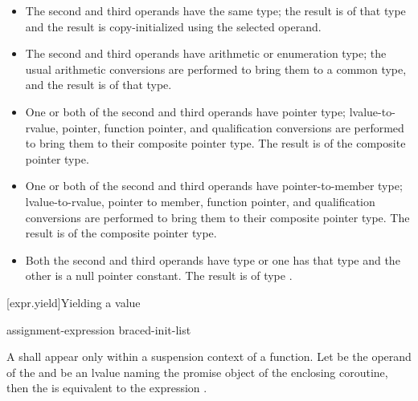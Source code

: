 \begin{itemize}
\item The second and third operands have the same type; the result is of
that type and the result is copy-initialized using the selected operand.

\item The second and third operands have arithmetic or enumeration type;
the usual arithmetic conversions are performed to bring them to a common
type, and the result is of that type.

\item One or both of the second and third operands have pointer type;
lvalue-to-rvalue,
pointer,
function pointer, and
qualification conversions
are performed to bring them to their
composite pointer type. The result is of the composite
pointer type.

\item One or both of the second and third operands have pointer-to-member type;
lvalue-to-rvalue,
pointer to member,
function pointer, and
qualification conversions
are performed to bring them to their composite
pointer type. The result is of the composite pointer type.

\item
Both the second and third operands have type  or one has
that type and the other is a null pointer constant. The result is of type
.

\end{itemize}

[expr.yield]{Yielding a value}%
%
%

\begin{bnf}
  \br
   assignment-expression\br
   braced-init-list
\end{bnf}

\pnum
A  shall appear only within a suspension context
of a function.
Let  be the operand of the  and
 be an lvalue naming the promise object of the enclosing
coroutine, then the 
is equivalent to the expression
.

